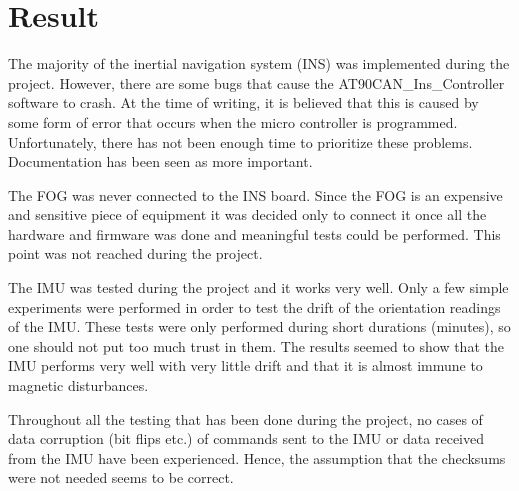 
\section{Result}\label{sec:result}
The majority of the inertial navigation system (INS) was implemented during the project. However, there are some bugs that cause the AT90CAN\_Ins\_Controller software to crash. At the time of writing, it is believed that this is caused by some form of error that occurs when the micro controller is programmed. Unfortunately, there has not been enough time to prioritize these problems. Documentation has been seen as more important.

The FOG was never connected to the INS board. Since the FOG is an expensive and sensitive piece of equipment it was decided only to connect it once all the hardware and firmware was done and meaningful tests could be performed. This point was not reached during the project.

The IMU was tested during the project and it works very well. Only a few simple experiments were performed in order to test the drift of the orientation readings of the IMU. These tests were only performed during short durations (minutes), so one should not put too much trust in them. The results seemed to show that the IMU performs very well with very little drift and that it is almost immune to magnetic disturbances.

Throughout all the testing that has been done during the project, no cases of data corruption (bit flips etc.) of commands sent to the IMU or data received from the IMU have been experienced. Hence, the assumption that the checksums were not needed seems to be correct.
